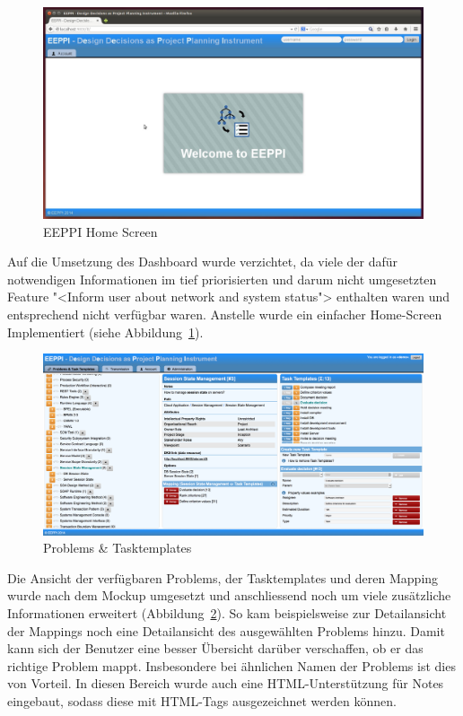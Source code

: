 		\begin{figure}[H]
			\centering
			\includegraphics[width=\linewidth]{tutorial/img/eeppiHomeScreen.jpg}
			\caption{EEPPI Home Screen}
			\label{fig:eeppiHomeScreen}
		\end{figure}	
		
		Auf die Umsetzung des Dashboard wurde verzichtet, da viele der dafür notwendigen Informationen im tief priorisierten und darum nicht umgesetzten Feature "<Inform user about network and system status"> enthalten waren und entsprechend nicht verfügbar waren.
		Anstelle wurde ein einfacher Home-Screen Implementiert (siehe Abbildung\ \ref{fig:eeppiHomeScreen}).
		
		
		\begin{figure}[H]
			\centering
			\includegraphics[width=\linewidth]{tutorial/img/eeppiDecisionsAndTaskTemplates.png}
			\caption{Problems \& Tasktemplates}
			\label{fig:eeppiDecisionsAndTaskTemplates}
		\end{figure}	
		
		Die Ansicht der verfügbaren Problems, der Tasktemplates und deren Mapping wurde nach dem Mockup umgesetzt und anschliessend noch um viele zusätzliche Informationen erweitert (Abbildung\ \ref{fig:eeppiDecisionsAndTaskTemplates}).
		So kam beispielsweise zur Detailansicht der Mappings noch eine Detailansicht des ausgewählten Problems hinzu.
		Damit kann sich der Benutzer eine besser Übersicht darüber verschaffen,
		ob er das richtige Problem mappt.
		Insbesondere bei ähnlichen Namen der Problems ist dies von Vorteil.
		In diesen Bereich wurde auch eine HTML-Unterstützung für Notes eingebaut, 
		sodass diese mit HTML-Tags ausgezeichnet werden können.
		
